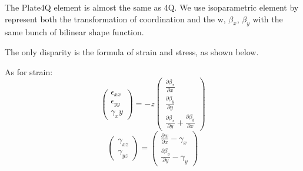 \documentclass[UTF8]{ctexbook}
\begin{document}
     The Plate4Q element is almost the same as 4Q. We use isoparametric element by represent both
     the transformation of coordination and the w, $\beta_x$, $\beta_y$ with the same bunch of bilinear
     shape function.

     The only disparity is the formula of strain and stress, as shown below.
     
     As for strain:
     \begin{equation}
     \left( \begin{array} {c}
        \epsilon_{xx} \\
        \epsilon_{yy} \\
        \gamma_xy \end{array}\right) = -z
     \left( \begin{array} {c}
        \frac{\partial \beta_x}{\partial x} \\
        \frac{\partial \beta_y}{\partial y} \\
        \frac{\partial \beta_x}{\partial y}+\frac{\partial \beta_y}{\partial x} \end{array}\right)
     \end{equation}
          \begin{equation}
     \left( \begin{array} {c}
        \gamma_{xz} \\
        \gamma_{yz} \end{array}\right) =
     \left( \begin{array} {c}
        \frac{\partial w}{\partial x} - \gamma_x\\
        \frac{\partial \beta_y}{\partial y} - \gamma_y \end{array}\right)
     \end{equation}
     
\end{document}

